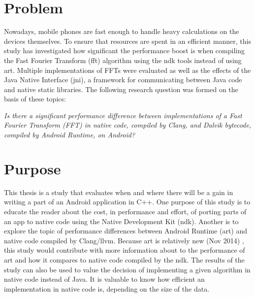 \section{Problem}
Nowadays, mobile phones are fast enough to handle heavy calculations on the devices themselves. To ensure that resources are spent in an efficient manner, this study has investigated how significant the performance boost is when compiling the Fast Fourier Transform (\gls{fft}) algorithm using the \gls{ndk} tools instead of using \gls{art}. Multiple implementations of FFTs were evaluated as well as the effects of the Java Native Interface (\gls{jni}), a framework for communicating between Java code and native static libraries. The following research question was formed on the basis of these topics:

\begin{center}
    \textit{Is there a significant performance difference between implementations of a Fast Fourier Transform (FFT) in native code, compiled by Clang, and Dalvik bytecode, compiled by Android Runtime, on Android?}
\end{center}

\section{Purpose}
This thesis is a study that evaluates when and where there will be a gain in writing a part of an Android application in C++. One purpose of this study is to educate the reader about the cost, in performance and effort, of porting parts of an app to native code using the Native Development Kit (\gls{ndk}). Another is to explore the topic of performance differences between Android Runtime (\gls{art}) and native code compiled by Clang/\gls{llvm}. Because \gls{art} is relatively new (Nov 2014) \cite{android:dalvik:release}, this study would contribute with more information about to the performance of \gls{art} and how it compares to native code compiled by the \gls{ndk}. The results of the study can also be used to value the decision of implementing a given algorithm in native code instead of Java. It is valuable to know how efficient an implementation in native code is, depending on the size of the data.

